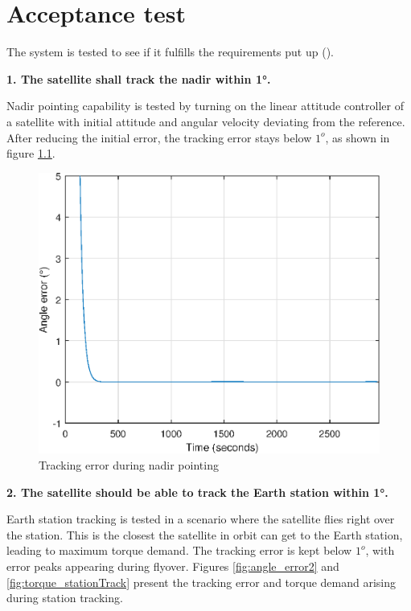 \chapter{Acceptance test} \label{chap:acceptanceTest}

The system is tested to see if it fulfills the requirements put up ().



\textbf{1. The satellite shall track the nadir within 1°.}

Nadir pointing capability is tested by turning on the linear attitude controller of a satellite with initial attitude and angular velocity deviating from the reference. After reducing the initial error, the tracking error stays below $1^o$, as shown in figure \ref{fig:angle_error}.

\begin{figure}[H]
	\centering
	\includegraphics[width=0.7\linewidth]{figures/angle_error}
	\caption{Tracking error during nadir pointing}
	\label{fig:angle_error}
\end{figure}

\textbf{2. The satellite should be able to track the Earth station within 1°.	}

Earth station tracking is tested in a scenario where the satellite flies right over the station. This is the closest the satellite in orbit can get to the Earth station, leading to maximum torque demand. The tracking error is kept below  $1^o$, with error peaks appearing during flyover. Figures \ref{fig:angle_error2} and \ref{fig:torque_stationTrack} present the tracking error and torque demand arising during station tracking.

